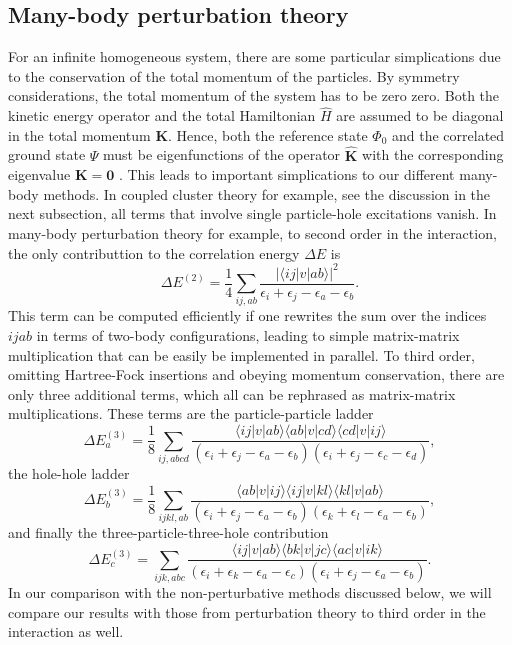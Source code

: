 \documentclass[aps,twocolumn,showpacs,floatfix,nofootinbib,preprintnumbers,superscriptaddress,amsmath,amssymb]{revtex4-1}
\begin{document}
\subsection{Many-body perturbation theory}
For an infinite homogeneous system, there are some particular simplications due to the conservation of the total momentum of the particles.
By symmetry considerations, the total momentum of the system has to be zero 
zero. Both the kinetic energy operator and the total 
Hamiltonian $\hat{H}$ are assumed to
be diagonal in the total momentum $\mathbf{K}$. Hence, both the reference state
$\Phi_{0}$ and the correlated ground state $\Psi$
must be eigenfunctions of the operator $\mathbf{\hat{K}}$ with the
corresponding eigenvalue $\mathbf{K} = \mathbf{0}$ \cite{day1967}.  
This leads to important simplications to our different many-body methods. In coupled cluster theory for example, see the discussion in the next subsection,
all terms that involve single particle-hole excitations vanish. In many-body perturbation theory for example, to second order in the interaction, the only contributtion 
to the correlation energy $\Delta E$ is
\begin{equation}
\Delta E^{(2)} = \frac{1}{4} \sum_{ij,ab} \frac{|\langle ij |v| ab \rangle|^2}{\epsilon_i+\epsilon_j-\epsilon_a-\epsilon_b}.
\end{equation}
This term can be computed efficiently if one rewrites the sum over the indices $ijab$ in terms of two-body configurations, leading to simple matrix-matrix
multiplication that can be easily be implemented in parallel. To third order, omitting Hartree-Fock insertions and obeying momentum conservation, there are only three additional terms, which all can be rephrased as matrix-matrix multiplications. These terms are the particle-particle ladder
\begin{equation}
\Delta E^{(3)}_a = \frac{1}{8} \sum_{ij,abcd} \frac{\langle ij |v| ab \rangle\langle ab |v| cd \rangle\langle cd |v| ij \rangle}{(\epsilon_i+\epsilon_j-\epsilon_a-\epsilon_b)(\epsilon_i+\epsilon_j-\epsilon_c-\epsilon_d)},
\end{equation}
the hole-hole ladder
\begin{equation}
\Delta E^{(3)}_b = \frac{1}{8} \sum_{ijkl,ab} \frac{\langle ab |v| ij \rangle\langle ij |v| kl \rangle\langle kl |v| ab \rangle}{(\epsilon_i+\epsilon_j-\epsilon_a-\epsilon_b)(\epsilon_k+\epsilon_l-\epsilon_a-\epsilon_b)},
\end{equation}
and finally the three-particle-three-hole contribution
\begin{equation}
\Delta E^{(3)}_c = \sum_{ijk,abc} \frac{\langle ij |v| ab \rangle\langle bk |v| jc \rangle\langle ac |v| ik \rangle}{(\epsilon_i+\epsilon_k-\epsilon_a-\epsilon_c)(\epsilon_i+\epsilon_j-\epsilon_a-\epsilon_b)}.
\end{equation}
In our comparison with the non-perturbative methods discussed below, we will compare our results with those from perturbation theory to third order in the interaction as well.
\end{document}
